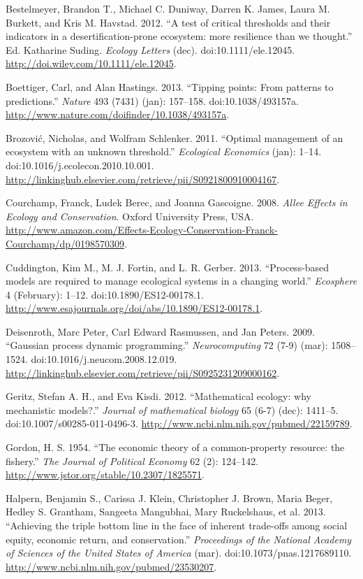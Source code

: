 \documentclass[author-year, review]{elsarticle} %
\begin{document}
Bestelmeyer, Brandon T., Michael C. Duniway, Darren K. James, Laura M.
Burkett, and Kris M. Havstad. 2012. ``A test of critical thresholds and
their indicators in a desertification-prone ecosystem: more resilience
than we thought.'' Ed. Katharine Suding. \emph{Ecology Letters} (dec).
doi:10.1111/ele.12045. \url{http://doi.wiley.com/10.1111/ele.12045}.

Boettiger, Carl, and Alan Hastings. 2013. ``Tipping points: From
patterns to predictions.'' \emph{Nature} 493 (7431) (jan): 157--158.
doi:10.1038/493157a.
\url{http://www.nature.com/doifinder/10.1038/493157a}.

Brozović, Nicholas, and Wolfram Schlenker. 2011. ``Optimal management of
an ecosystem with an unknown threshold.'' \emph{Ecological Economics}
(jan): 1--14. doi:10.1016/j.ecolecon.2010.10.001.
\url{http://linkinghub.elsevier.com/retrieve/pii/S0921800910004167}.

Courchamp, Franck, Ludek Berec, and Joanna Gascoigne. 2008. \emph{Allee
Effects in Ecology and Conservation}. Oxford University Press, USA.
\url{http://www.amazon.com/Effects-Ecology-Conservation-Franck-Courchamp/dp/0198570309}.

Cuddington, Kim M., M. J. Fortin, and L. R. Gerber. 2013.
``Process-based models are required to manage ecological systems in a
changing world.'' \emph{Ecosphere} 4 (February): 1--12.
doi:10.1890/ES12-00178.1.
\url{http://www.esajournals.org/doi/abs/10.1890/ES12-00178.1}.

Deisenroth, Marc Peter, Carl Edward Rasmussen, and Jan Peters. 2009.
``Gaussian process dynamic programming.'' \emph{Neurocomputing} 72 (7-9)
(mar): 1508--1524. doi:10.1016/j.neucom.2008.12.019.
\url{http://linkinghub.elsevier.com/retrieve/pii/S0925231209000162}.

Geritz, Stefan A. H., and Eva Kisdi. 2012. ``Mathematical ecology: why
mechanistic models?.'' \emph{Journal of mathematical biology} 65 (6-7)
(dec): 1411--5. doi:10.1007/s00285-011-0496-3.
\url{http://www.ncbi.nlm.nih.gov/pubmed/22159789}.

Gordon, H. S. 1954. ``The economic theory of a common-property resource:
the fishery.'' \emph{The Journal of Political Economy} 62 (2): 124--142.
\url{http://www.jstor.org/stable/10.2307/1825571}.

Halpern, Benjamin S., Carissa J. Klein, Christopher J. Brown, Maria
Beger, Hedley S. Grantham, Sangeeta Mangubhai, Mary Ruckelshaus, et al.
2013. ``Achieving the triple bottom line in the face of inherent
trade-offs among social equity, economic return, and conservation.''
\emph{Proceedings of the National Academy of Sciences of the United
States of America} (mar). doi:10.1073/pnas.1217689110.
\url{http://www.ncbi.nlm.nih.gov/pubmed/23530207}.
\end{document}
